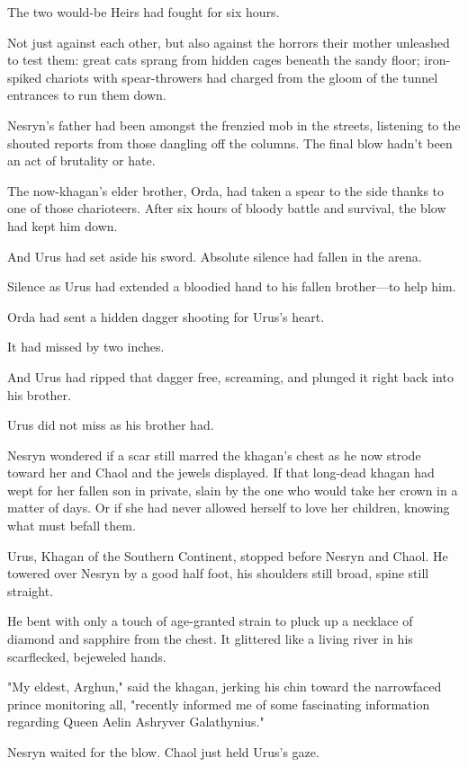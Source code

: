 The two would-be Heirs had fought for six hours.

Not just against each other, but also against the horrors their mother unleashed to test them: great cats sprang from hidden cages beneath the sandy floor; iron-spiked chariots with spear-throwers had charged from the gloom of the tunnel entrances to run them down.

Nesryn's father had been amongst the frenzied mob in the streets, listening to the shouted reports from those dangling off the columns. The final blow hadn't been an act of brutality or hate.

The now-khagan's elder brother, Orda, had taken a spear to the side thanks to one of those charioteers. After six hours of bloody battle and survival, the blow had kept him down.

And Urus had set aside his sword. Absolute silence had fallen in the arena.

Silence as Urus had extended a bloodied hand to his fallen brother---to help him.

Orda had sent a hidden dagger shooting for Urus's heart.

It had missed by two inches.

And Urus had ripped that dagger free, screaming, and plunged it right back into his brother.

Urus did not miss as his brother had.

Nesryn wondered if a scar still marred the khagan's chest as he now strode toward her and Chaol and the jewels displayed. If that long-dead khagan had wept for her fallen son in private, slain by the one who would take her crown in a matter of days. Or if she had never allowed herself to love her children, knowing what must befall them.

Urus, Khagan of the Southern Continent, stopped before Nesryn and Chaol. He towered over Nesryn by a good half foot, his shoulders still broad, spine still straight.

He bent with only a touch of age-granted strain to pluck up a necklace of diamond and sapphire from the chest. It glittered like a living river in his scarflecked, bejeweled hands.

"My eldest, Arghun," said the khagan, jerking his chin toward the narrowfaced prince monitoring all, "recently informed me of some fascinating information regarding Queen Aelin Ashryver Galathynius."

Nesryn waited for the blow. Chaol just held Urus's gaze.

